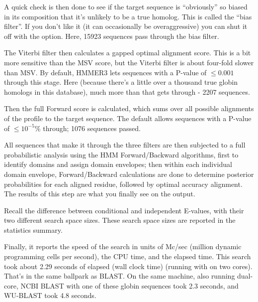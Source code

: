 A quick check is then done to see if the target sequence is
``obviously'' so biased in its composition that it's unlikely to be a
true homolog. This is called the ``bias filter''. If you don't like it
(it can occasionally be overaggressive) you can shut it off with the
 option. Here, 15923 sequences pass through the bias
filter.

The Viterbi filter then calculates a gapped optimal alignment score.
This is a bit more sensitive than the MSV score, but the Viterbi
filter is about four-fold slower than MSV. By default, HMMER3 lets
sequences with a P-value of $\leq 0.001$ through this stage. Here
(because there's a little over a thousand true globin homologs in this
database), much more than that gets through - 2207 sequences.

Then the full Forward score is calculated, which sums over all
possible alignments of the profile to the target sequence. The default
allows sequences with a P-value of $\leq 10^{-5}$\% through; 1076
sequences passed.

All sequences that make it through the three filters are then
subjected to a full probabilistic analysis using the HMM
Forward/Backward algorithms, first to identify domains and assign
domain envelopes; then within each individual domain envelope,
Forward/Backward calculations are done to determine posterior
probabilities for each aligned residue, followed by optimal accuracy
alignment. The results of this step are what you finally see on the
output.

Recall the difference between conditional and independent E-values,
with their two different search space sizes. These search space sizes
are reported in the statistics summary.

Finally, it reports the speed of the search in units of Mc/sec
(million dynamic programming cells per second), the CPU time, and the
elapsed time. This search took about 2.29 seconds of elapsed (wall
clock time) (running with  on two cores). That's in the
same ballpark as BLAST. On
the same machine, also running dual-core, NCBI BLAST with one of these
globin sequences took 2.3 seconds, and WU-BLAST took 4.8 seconds.






















